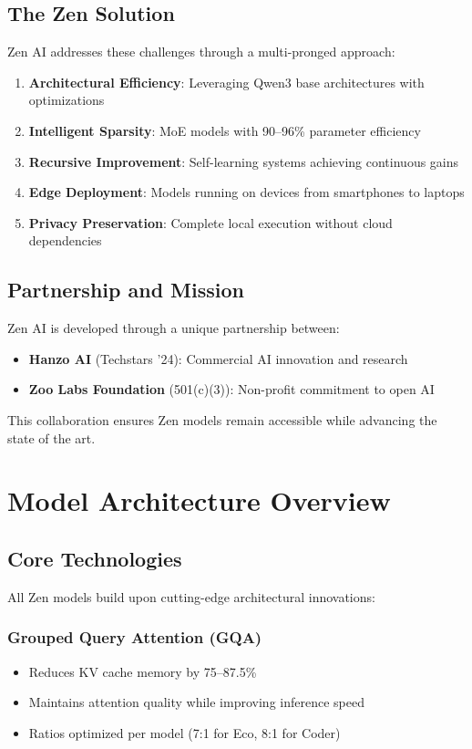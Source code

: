 \documentclass[11pt,a4paper]{article}
\begin{document}
\subsection{The Zen Solution}

Zen AI addresses these challenges through a multi-pronged approach:

\begin{enumerate}
    \item \textbf{Architectural Efficiency}: Leveraging Qwen3 base architectures with optimizations
    \item \textbf{Intelligent Sparsity}: MoE models with 90--96\% parameter efficiency
    \item \textbf{Recursive Improvement}: Self-learning systems achieving continuous gains
    \item \textbf{Edge Deployment}: Models running on devices from smartphones to laptops
    \item \textbf{Privacy Preservation}: Complete local execution without cloud dependencies
\end{enumerate}

\subsection{Partnership and Mission}

Zen AI is developed through a unique partnership between:
\begin{itemize}
    \item \textbf{Hanzo AI} (Techstars '24): Commercial AI innovation and research
    \item \textbf{Zoo Labs Foundation} (501(c)(3)): Non-profit commitment to open AI
\end{itemize}

This collaboration ensures Zen models remain accessible while advancing the state
of the art.

\section{Model Architecture Overview}

\subsection{Core Technologies}

All Zen models build upon cutting-edge architectural innovations:

\subsubsection{Grouped Query Attention (GQA)}
\begin{itemize}
    \item Reduces KV cache memory by 75--87.5\%
    \item Maintains attention quality while improving inference speed
    \item Ratios optimized per model (7:1 for Eco, 8:1 for Coder)
\end{itemize}
\end{document}
